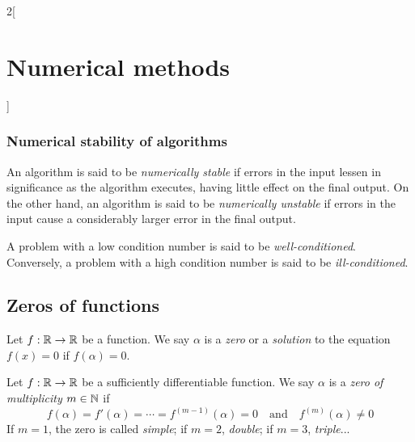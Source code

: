 \documentclass[../../../main_math.tex]{subfiles}
\begin{document}
\begin{multicols}{2}[\section{Numerical methods}]
  \subsubsection{Numerical stability of algorithms}
  \begin{definition}
    An algorithm is said to be \emph{numerically stable} if  errors in the input lessen in significance as the algorithm executes, having little effect on the final output. On the other hand, an algorithm is said to be \emph{numerically unstable} if errors in the input cause a considerably larger error in the final output.
  \end{definition}
  \begin{definition}
    A problem with a low condition number is said to be \emph{well-conditioned}. Conversely, a problem with a high condition number is said to be \emph{ill-conditioned}.
  \end{definition}
  \subsection{Zeros of functions}
  \begin{definition}
    Let $f:\mathbb{R}\rightarrow\mathbb{R}$ be a function. We say $\alpha$ is a \emph{zero} or a \emph{solution} to the equation $f(x)=0$ if $f(\alpha)=0$.
  \end{definition}
  \begin{definition}
    Let $f:\mathbb{R}\rightarrow\mathbb{R}$ be a sufficiently differentiable function. We say $\alpha$ is a \emph{zero of multiplicity $m\in\mathbb{N}$} if $$f(\alpha)=f'(\alpha)=\cdots=f^{(m-1)}(\alpha)=0\quad\text{and}\quad f^{(m)}(\alpha)\ne0$$ If $m=1$, the zero is called \emph{simple}; if $m=2$, \emph{double}; if $m=3$, \emph{triple}...
  \end{definition}

\end{multicols}
\end{document}
